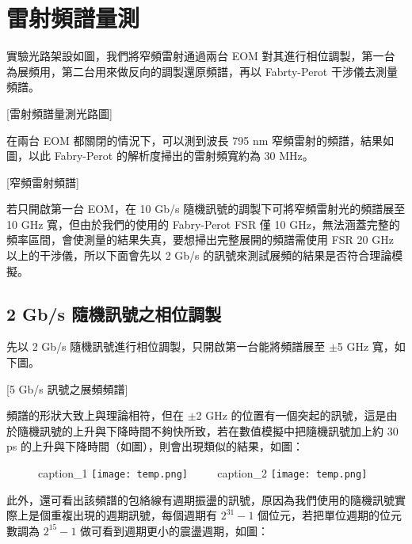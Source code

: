 \documentclass[class=NCU_thesis, crop=false]{standalone}
\begin{document}
\section{雷射頻譜量測}

實驗光路架設如圖，我們將窄頻雷射通過兩台 EOM 對其進行相位調製，第一台為展頻用，第二台用來做反向的調製還原頻譜，再以 Fabrty-Perot 干涉儀去測量頻譜。

[雷射頻譜量測光路圖]

在兩台 EOM 都關閉的情況下，可以測到波長 795 nm 窄頻雷射的頻譜，結果如圖，以此 Fabry-Perot 的解析度掃出的雷射頻寬約為 30 MHz。

[窄頻雷射頻譜]

若只開啟第一台 EOM，在 10 Gb/s 隨機訊號的調製下可將窄頻雷射光的頻譜展至 10 GHz 寬，但由於我們的使用的 Fabry-Perot FSR 僅 10 GHz，無法涵蓋完整的頻率區間，會使測量的結果失真，要想掃出完整展開的頻譜需使用 FSR 20 GHz 以上的干涉儀，所以下面會先以 2 Gb/s 的訊號來測試展頻的結果是否符合理論模擬。

\subsection{2 Gb/s 隨機訊號之相位調製}
先以 2 Gb/s 隨機訊號進行相位調製，只開啟第一台能將頻譜展至 $\pm$5 GHz 寬，如下圖。

[5 Gb/s 訊號之展頻頻譜]

頻譜的形狀大致上與理論相符，但在 $\pm$2 GHz 的位置有一個突起的訊號，這是由於隨機訊號的上升與下降時間不夠快所致，若在數值模擬中把隨機訊號加上約 30 ps 的上升與下降時間（如圖），則會出現類似的結果，如圖：

\begin{figure}[!hbt]
    \centering
    \subcaptionbox
        {caption\_1
        \label{fig:subfig_fig1}}
        {\texttt{[image: temp.png]}}
    ~~~~
    \subcaptionbox
        {caption\_2
        \label{fig:subfig_fig2}}
        {\texttt{[image: temp.png]}}
\end{figure}


此外，還可看出該頻譜的包絡線有週期振盪的訊號，原因為我們使用的隨機訊號實際上是個重複出現的週期訊號，每個週期有 $2^{31}-1$ 個位元，若把單位週期的位元數調為 $2^{15}-1$ 做可看到週期更小的震盪週期，如圖：
\end{document}
